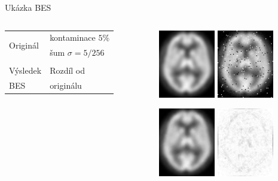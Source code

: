 \documentclass[compress,mathserif]{beamer}
\theoremstyle{definition}
\theoremstyle{plain}
\begin{document}
    \begin{frame}{Ukázka BES}

    \begin{columns}
    \begin{column}{0.4\textwidth}
        \begin{table}
          \begin{tabular}{ll}
            \multirow{2}{*}{Originál} \hfill & kontaminace $5\%$ \hfill\\
            & šum $\sigma = 5/256$ \\
            \vspace{2cm} & \\
            Výsledek & Rozdíl od \\
            BES & originálu\\
          \end{tabular}
        \end{table}
    \end{column}

    \begin{column}{0.6\textwidth}
    \begin{figure}
     \includegraphics[width = 70pt]{img/original.png}
             \hspace{10pt}
     \includegraphics[width = 70pt]{img/5-30contaminated.png}
    \end{figure}
    \vspace{-10pt}
    \begin{figure}
    \includegraphics[width = 70pt]{img/5-30bes.png}
         \hspace{10pt}
    \includegraphics[width = 70pt]{img/5-30besD.png}
    \end{figure}
    \end{column}
    \end{columns}
    \end{frame}
\end{document}
